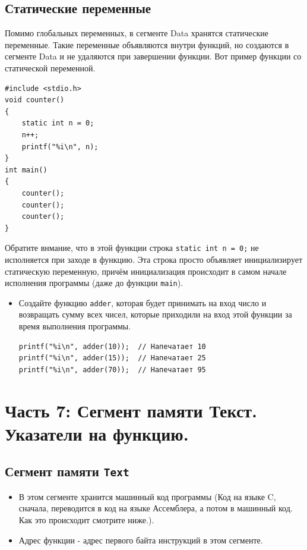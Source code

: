 \documentclass{article}
\begin{document}
\subsection*{Статические переменные}
Помимо глобальных переменных, в сегменте Data хранятся статические переменные. Такие переменные объявляются внутри функций, но создаются в сегменте Data и не удаляются при завершении функции. Вот пример функции со статической переменной.
\begin{lstlisting}
#include <stdio.h>
void counter() 
{
    static int n = 0;
    n++;
    printf("%i\n", n);
}
int main() 
{
    counter();
    counter();
    counter();
}
\end{lstlisting}
Обратите внмание, что в этой функции строка \texttt{static int n = 0;} не исполняется при заходе в функцию. Эта строка просто объявляет инициализирует статическую переменную, причём инициализация происходит в самом начале исполнения программы (даже до функции \texttt{main}). 

\begin{itemize}
\item Создайте функцию \texttt{adder}, которая будет принимать на вход число и возвращать сумму всех чисел, которые приходили на вход этой функции за время выполнения программы.
\begin{lstlisting}
printf("%i\n", adder(10));  // Напечатает 10
printf("%i\n", adder(15));  // Напечатает 25
printf("%i\n", adder(70));  // Напечатает 95
\end{lstlisting}
\end{itemize}




\newpage
\section*{Часть 7: Сегмент памяти Текст. Указатели на функцию.}

\subsection*{Сегмент памяти \texttt{Text}}
\begin{itemize}
\item В этом сегменте хранится машинный код программы (Код на языке C, сначала, переводится в код на языке Ассемблера, а потом в машинный код. Как это происходит смотрите ниже.).
\item Адрес функции - адрес первого байта инструкций в этом сегменте.
\end{itemize}
\end{document}
